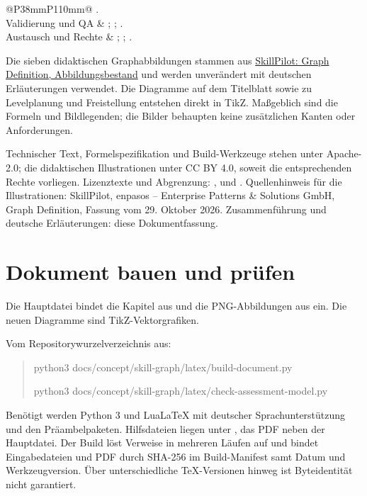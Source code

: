 \begin{longtable}{@{}P{38mm}P{110mm}@{}}
.\\
Validierung und QA &
;
;
.\\
Austausch und Rechte &
;
;
.\\
\bottomrule
\end{longtable}

Die sieben didaktischen Graphabbildungen stammen aus
\href{https://github.com/enpasos/skillpilot/tree/main/docs/concept/skill-graph/assets/graph-definition}{SkillPilot: Graph Definition, Abbildungsbestand}
und werden unverändert mit deutschen Erläuterungen verwendet.
Die Diagramme auf dem Titelblatt sowie zu Levelplanung und Freistellung
entstehen direkt in TikZ. Maßgeblich sind die Formeln und Bildlegenden;
die Bilder behaupten keine zusätzlichen Kanten oder Anforderungen.

Technischer Text, Formelspezifikation und Build-Werkzeuge stehen unter
Apache-2.0; die didaktischen Illustrationen unter CC BY 4.0, soweit die
entsprechenden Rechte vorliegen. Lizenztexte und Abgrenzung:
,
 und
.
Quellenhinweis für die Illustrationen: SkillPilot, enpasos -- Enterprise
Patterns \& Solutions GmbH, Graph Definition, Fassung vom 29. Oktober 2026.
Zusammenführung und deutsche Erläuterungen: diese Dokumentfassung.

\section{Dokument bauen und prüfen}
Die Hauptdatei  bindet die Kapitel
aus  und die PNG-Abbildungen aus
 ein. Die neuen Diagramme sind TikZ-Vektorgrafiken.

Vom Repositorywurzelverzeichnis aus:
\begin{quote}\small\ttfamily
python3 docs/concept/skill-graph/latex/build-document.py\par
python3 docs/concept/skill-graph/latex/check-assessment-model.py
\end{quote}
Benötigt werden Python 3 und LuaLaTeX mit deutscher Sprachunterstützung
und den Präambelpaketen. Hilfsdateien liegen unter
, das PDF neben der Hauptdatei.
Der Build löst Verweise in mehreren Läufen auf und bindet Eingabedateien
und PDF durch SHA-256 im Build-Manifest samt Datum und Werkzeugversion.
Über unterschiedliche TeX-Versionen hinweg ist Byteidentität nicht garantiert.

